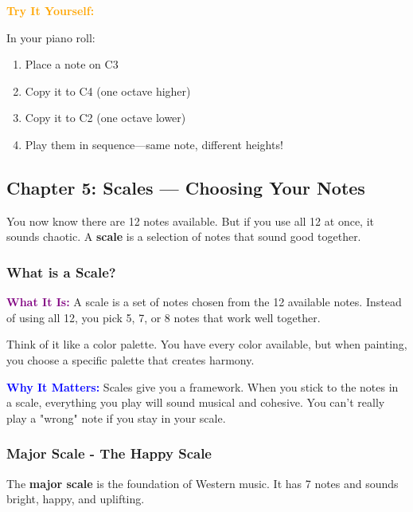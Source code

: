 \documentclass[11pt,letterpaper]{article}
\newcommand{\purple}[1]{\textcolor{purple}{\textbf{#1}}}
\newcommand{\bluepurple}[1]{\textcolor{blue}{\textbf{#1}}}
\newcommand{\orangetext}[1]{\textcolor{orange}{\textbf{#1}}}
\begin{document}
\textbf{\orangetext{Try It Yourself:}}

In your piano roll:
\begin{enumerate}[leftmargin=*]
\item Place a note on C3
\item Copy it to C4 (one octave higher)
\item Copy it to C2 (one octave lower)
\item Play them in sequence—same note, different heights!
\end{enumerate}

\newpage


\subsection{Chapter 5: Scales — Choosing Your Notes}

You now know there are 12 notes available. But if you use all 12 at once, it sounds chaotic. A \textbf{scale} is a selection of notes that sound good together.

\subsubsection{What is a Scale?}

\textbf{\purple{What It Is:}} A scale is a set of notes chosen from the 12 available notes. Instead of using all 12, you pick 5, 7, or 8 notes that work well together.

Think of it like a color palette. You have every color available, but when painting, you choose a specific palette that creates harmony.

\textbf{\bluepurple{Why It Matters:}} Scales give you a framework. When you stick to the notes in a scale, everything you play will sound musical and cohesive. You can't really play a "wrong" note if you stay in your scale.

\subsubsection{Major Scale - The Happy Scale}

The \textbf{major scale} is the foundation of Western music. It has 7 notes and sounds bright, happy, and uplifting.
\end{document}
